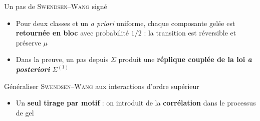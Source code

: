 \begin{frame}[t]{Un pas de \textsc{Swendsen}--\textsc{Wang} signé}
    \begin{center}
        \scalebox{0.9}{}
    \end{center}

    \vspace{0.02cm}
    \begin{center}
    \end{center}

    \vspace{0.05cm}
    \footnotesize
    \begin{itemize}
        \setlength{\itemsep}{2pt}
        \item Pour deux classes et un \emph{a priori} uniforme, chaque composante gelée est
        \textbf{retournée en bloc} avec probabilité $1/2$ : la transition est réversible et préserve $\mu$ 
        \item Dans la preuve, un pas depuis $\Sigma$ produit une
        \textbf{réplique couplée de la loi \emph{a posteriori}} $\Sigma^{(1)}$
    \end{itemize}
\end{frame}

\begin{frame}{Généraliser \textsc{Swendsen}--\textsc{Wang} aux interactions d'ordre supérieur}
    \begin{center}
    \end{center}

    \vspace{0.12cm}
    \begin{center}
        \scalebox{0.9}{}
    \end{center}

    \vspace{0.08cm}
    \footnotesize
    \begin{itemize}
        \item Un \textbf{seul tirage par motif} : on introduit de la \textbf{corrélation}
        dans le processus de gel  
    \end{itemize}
\end{frame}

